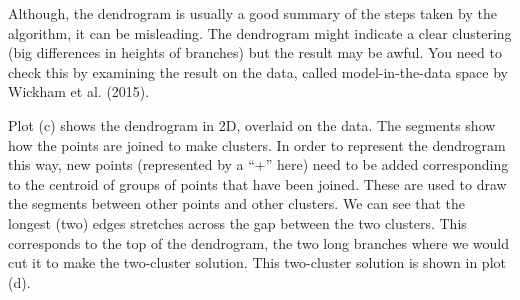 \documentclass[
  letterpaper,
]{krantz}
\begin{document}
Although, the dendrogram is usually a good summary of the steps taken by
the algorithm, it can be misleading. The dendrogram might indicate a
clear clustering (big differences in heights of branches) but the result
may be awful. You need to check this by examining the result on the
data, called model-in-the-data space by Wickham et al. (2015).

Plot (c) shows the dendrogram in 2D, overlaid on the data. The segments
show how the points are joined to make clusters. In order to represent
the dendrogram this way, new points (represented by a ``+'' here) need
to be added corresponding to the centroid of groups of points that have
been joined. These are used to draw the segments between other points
and other clusters. We can see that the longest (two) edges stretches
across the gap between the two clusters. This corresponds to the top of
the dendrogram, the two long branches where we would cut it to make the
two-cluster solution. This two-cluster solution is shown in plot (d).
\end{document}
